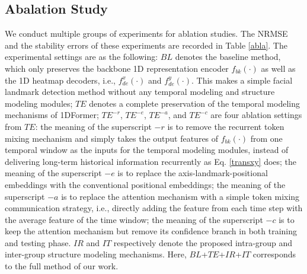 \documentclass[review]{elsarticle}
\begin{document}
\subsection{Abalation Study}
\label{as}
We conduct multiple groups of experiments for ablation studies. The NRMSE and the stability errors of these experiments are recorded in Table \ref{abla}. The experimental settings are as the following:  $BL$ denotes the baseline method, which only preserves the backbone 1D representation encoder $f_{bk}(\cdot)$ as well as the 1D heatmap decoders, i.e.,  $f^x_{de}(\cdot)$ and $f^y_{de}(\cdot)$. This makes a simple facial landmark detection method without any temporal modeling and structure modeling modules; $TE$ denotes a complete preservation of the temporal modeling mechanisms of 1DFormer; $TE^{-r}$, $TE^{-e}$, $TE^{-a}$, and $TE^{-c}$ are four ablation settings from $TE$: the meaning of the superscript $-r$ is to remove the recurrent token mixing mechanism and simply takes the output features of $f_{bk}(\cdot)$ from one temporal window as the inputs for the temporal modeling modules, instead of delivering long-term historical information recurrently as Eq. \eqref{transxy} does; the meaning of the  superscript $-e$ is to replace the axis-landmark-positional embeddings with the conventional positional embeddings;
the meaning of the superscript $-a$ is to replace the attention mechanism with a simple token mixing communication strategy, i.e., directly adding the feature from each time step with the average feature of the time window; the meaning of the  superscript $-c$ is to keep the attention mechanism but remove its confidence branch in both training and testing phase. $IR$ and $IT$ respectively denote the proposed intra-group and inter-group structure modeling mechanisms. Here, $BL$+$TE$+$IR$+$IT$ corresponds to the full method of our work.
\end{document}

